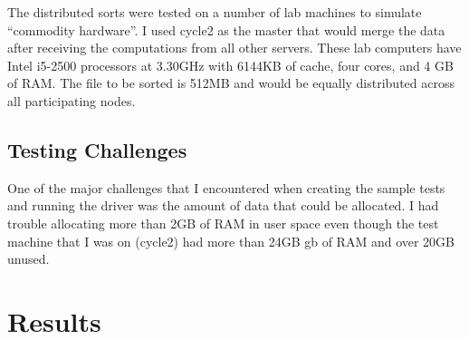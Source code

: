 \documentclass[11pt,letterpaper]{article}
\begin{document}
The distributed sorts were tested on a number of lab machines to simulate 
``commodity hardware''. I used cycle2 as the master that would merge the data
after receiving the computations from all other servers.  These lab computers have Intel i5-2500 processors at 3.30GHz with 6144KB of cache, four cores, and 4 GB of RAM.  The file to be sorted is 512MB and would be equally distributed across all participating nodes.
  
\subsection{Testing Challenges}
One of the major challenges that I encountered when creating the sample tests
and running the driver was the amount of data that could be allocated.  I had
trouble allocating more than 2GB of RAM in user space even though the test
machine  that I was on (cycle2) had more than 24GB gb of RAM and over 20GB
unused.

\section{Results}
\end{document}
